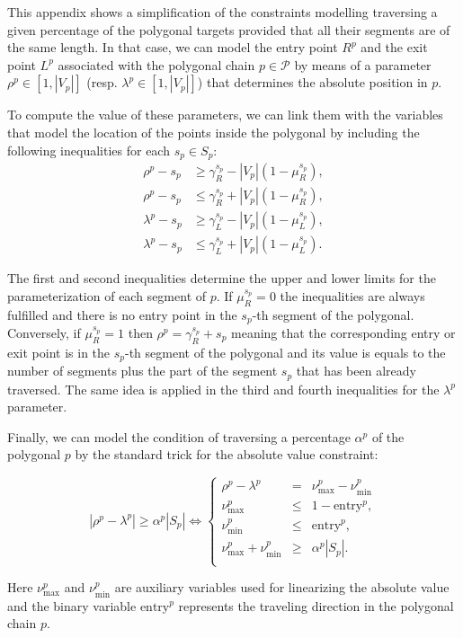 \documentclass{itor}
\theoremstyle{definition}
\theoremstyle{remark}
\begin{document}



\vspace*{-10pt}
\label{appendix}

This appendix shows a simplification of the constraints modelling traversing a given percentage of the polygonal targets provided that all their segments are of the same length. In that case, we can model the entry point $R^p$ and the exit point $L^p$ associated with the polygonal chain $p\in\mathcal P$ by means of a parameter $\rho^p\in[1, |V_p|]$ (resp. $\lambda^p\in[1, |V_p|]$) that determines the absolute position in $p$. 

To compute the value of these parameters, we can link them with the variables that model the location of the points inside the polygonal by including the following inequalities for each $s_p\in S_p$:
\begin{align*}
    \rho^p - s_p &\geq \gamma_R^{s_p} - |V_p|(1-\mu_R^{s_p}),\\
    \rho^p - s_p &\leq \gamma_R^{s_p} + |V_p|(1-\mu_R^{s_p}),\\
    \lambda^p - s_p &\geq \gamma_L^{s_p} - |V_p|(1-\mu_L^{s_p}),\\
    \lambda^p - s_p &\leq \gamma_L^{s_p} + |V_p|(1-\mu_L^{s_p}).
\end{align*}

The first and second inequalities determine the upper and lower limits for the parameterization of each segment of $p$. If $\mu_R^{s_p}=0$ the inequalities are always fulfilled and there is no entry point in the $s_p$-th segment of the polygonal. Conversely, if $\mu_R^{s_p}=1$ then $\rho^p=\gamma_R^{s_p}+s_p$ meaning that the corresponding entry or exit point is in the $s_p$-th segment of the polygonal and its value is equals to the number of segments plus the part of the segment $s_p$ that has been already traversed. The same idea is applied in the third and fourth inequalities for the $\lambda^p$ parameter.

Finally, we can model the condition of traversing a percentage $\alpha^p$ of the polygonal $p$ by the standard trick for the absolute value constraint:

\begin{equation}\label{eq:alpha-p}\tag{$\alpha-\mathcal P$}
 |\rho^{p}-\lambda^{p}|\geq \alpha^{p} |S_p| \Longleftrightarrow
 \left\{
 \begin{array}{ccl}
  \rho^{p} - \lambda^{p} & = & \nu_\text{max}^{p} - \nu_\text{min}^{p} \\
  \nu_\text{max}^{p} & \leq & 1-{\text{entry}^{p}}, \\
  \nu_\text{min}^{p} & \leq & {  \text{entry}^{p}}, \\
  \nu_\text{max}^{p} + \nu_\text{min}^{p} & \geq & \alpha^{p} |S_p|. \\
 \end{array}
 \right.
\end{equation}

Here $\nu_\text{max}^p$ and $\nu_\text{min}^p$ are auxiliary variables used for linearizing the absolute value and the binary variable $\text{entry}^p$ represents the traveling direction in the polygonal chain $p$.
\end{document}
